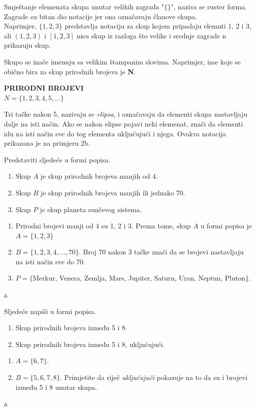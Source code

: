 \documentclass[a4paper,14pt,svgnames]{article}
\newcounter{counter}
\newcommand{\examplecounter}{\textbf{\refstepcounter{counter}PRIMJER \thecounter}}
\newcommand{\example}[3]{\begin{tcolorbox}[title=\large \examplecounter \hfill\small\textbf{"#1"}]
#2
\begin{tcolorbox}[title=\small \textbf{RJEŠENJE},colback=white]
\begin{center}
#3

\vspace{0.5em}\hfill $\vartriangle$
\end{center}
\end{tcolorbox}
\end{tcolorbox}}
\begin{document}
Smještanje elemenata skupa unutar velikih zagrada "$\{ \}$", naziva se ruster forma. Zagrade su bitan dio notacije jer ona označavaju članove skupa.\\
Naprimjer, $\{1, 2, 3\}$ predstavlja notaciju za skup kojem pripadaju elemnti 1, 2 i 3, ali $(1, 2, 3)$ i $[1, 2, 3]$ nisu skup iz razloga što velike i srednje zagrade n prikazuju skup.

Skupo se inače imenuju sa velikim štampanim slovima. Naprimjer, ime koje se obično bira za skup prirodnih brojeva je \textbf{N}.\\
\begin{tcolorbox}
\begin{center}
\textbf{\textsc{PRIRODNI BROJEVI}}\\
$N = \{1, 2, 3, 4, 5, ... \}$
\end{center}
\end{tcolorbox}
Tri tačke nakon 5, nazivaju se \textit{elipsa}, i označavaju da elementi skupa nastavljaju dalje na isti način. Ako se nakon elipse pojavi neki elemenat, znači da elementi idu na isti način sve do tog elementa uključujući i njega. Ovakva notacija prikazana je na primjeru 2b.
\example{Skup u formi popisa}{Predstaviti sljedeće u formi popisa.\begin{enumerate}[label=\alph*),leftmargin=0.5cm]
\item Skup $A$ je skup prirodnih brojeva manjih od 4.
\item Skup $B$ je skup prirodnih brojeva manjih ili jednako 70.
\item Skup $P$ je skup planeta sunčevog sistema.
\end{enumerate}}{\begin{enumerate}[label=\alph*),leftmargin=0.5cm]
\item Prirodni brojevi manji od 4 su 1, 2 i 3. Prema tome, skup $A$ u formi popisa je $A=\{1,2,3\}$
\item $B=\{1, 2, 3, 4, ... , 70\}$. Broj 70 nakon 3 tačke znači da se brojevi nastavljaju na isti način sve do 70.
\item $P=\{$Merkur, Venera, Zemlja, Mars, Jupiter, Saturn, Uran, Neptun, Pluton$\}$.
\end{enumerate}}

\example{Riječ \textit{uključujući}}{Sljedeće napiši u formi popisa.
\begin{enumerate}[label=\alph*),leftmargin=0.5cm]
\item Skup prirodnih brojeva između 5 i 8.
\item Skup prirodnih brojeva između 5 i 8, uključujući.
\end{enumerate}}{\begin{enumerate}[label=\alph*),leftmargin=0.5cm]
\item $A=\{6, 7\}$.
\item $B=\{5, 6, 7, 8\}$. Primjetite da riječ \textit{uključujuči} pokazuje na to da su i brojevi između 5 i 8 unutar skupa.
\end{enumerate}}
\end{document}

